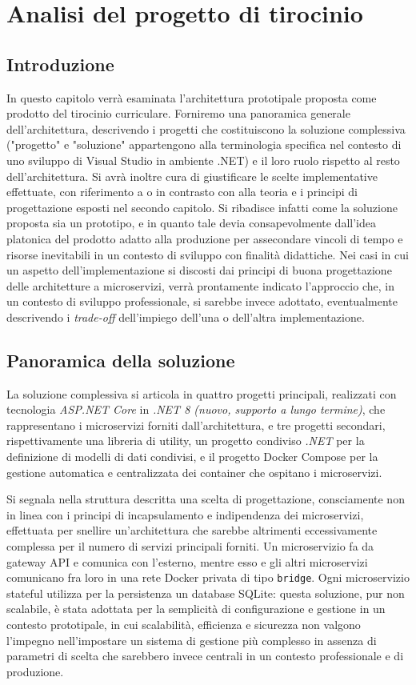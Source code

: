 \chapter{Analisi del progetto di tirocinio}
\section{Introduzione}
In questo capitolo verrà esaminata l'architettura prototipale proposta come prodotto del tirocinio curriculare. Forniremo una panoramica generale dell'architettura, descrivendo i progetti che costituiscono la soluzione complessiva ("progetto" e "soluzione" appartengono alla terminologia specifica nel contesto di uno sviluppo di Visual Studio in ambiente .NET) e il loro ruolo rispetto al resto dell'architettura. Si avrà inoltre cura di giustificare le scelte implementative effettuate, con riferimento a o in contrasto con alla teoria e i principi di progettazione esposti nel secondo capitolo. Si ribadisce infatti come la soluzione proposta sia un prototipo, e in quanto tale devia consapevolmente dall'idea platonica del prodotto adatto alla produzione per assecondare vincoli di tempo e risorse inevitabili in un contesto di sviluppo con finalità didattiche. Nei casi in cui un aspetto dell'implementazione si discosti dai principi di buona progettazione delle architetture a microservizi, verrà prontamente indicato l'approccio che, in un contesto di sviluppo professionale, si sarebbe invece adottato, eventualmente descrivendo i \emph{trade-off} dell'impiego dell'una o dell'altra implementazione.

\section{Panoramica della soluzione}
La soluzione complessiva si articola in quattro progetti principali, realizzati con tecnologia \emph{ASP.NET Core} in \emph{.NET 8 \emph{(nuovo, supporto a lungo termine)}}, che rappresentano i microservizi forniti dall'architettura, e tre progetti secondari, rispettivamente una libreria di utility, un progetto condiviso \emph{.NET} per la definizione di modelli di dati condivisi, e il progetto Docker Compose per la gestione automatica e centralizzata dei container che ospitano i microservizi.

Si segnala nella struttura descritta una scelta di progettazione, consciamente non in linea con i principi di incapsulamento e indipendenza dei microservizi, effettuata per snellire un'architettura che sarebbe altrimenti eccessivamente complessa per il numero di servizi principali forniti. Un microservizio fa da gateway API e comunica con l'esterno, mentre esso e gli altri microservizi comunicano fra loro in una rete Docker privata di tipo \texttt{bridge}. Ogni microservizio stateful utilizza per la persistenza un database SQLite: questa soluzione, pur non scalabile, è stata adottata per la semplicità di configurazione e gestione in un contesto prototipale, in cui scalabilità, efficienza e sicurezza non valgono l'impegno nell'impostare un sistema di gestione più complesso in assenza di parametri di scelta che sarebbero invece centrali in un contesto professionale e di produzione.

